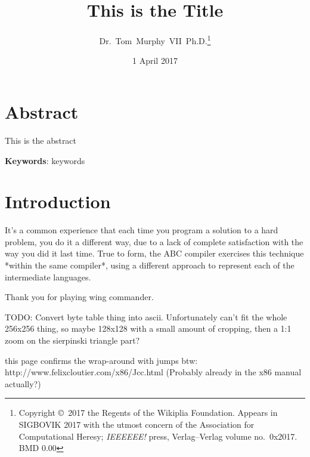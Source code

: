 \documentclass[twocolumn]{article}
\begin{document}
 

\title{This is the Title}
\author{Dr.~Tom~Murphy~VII~Ph.D.\thanks{
    Copyright \copyright\ 2017 the Regents of the Wikiplia Foundation.
    Appears in SIGBOVIK 2017 with the utmost concern of the
    Association for Computational Heresy; {\em IEEEEEE!} press,
    Verlag--Verlag volume no.~0x2017. BMD 0.00} }

\renewcommand\>{$>$}
\newcommand\<{$<$}

\date{1 April 2017}

\maketitle

\section*{Abstract}
This is the abstract

\vspace{1em}
{\noindent \small {\bf Keywords}:
  keywords
}

\section{Introduction}





It's a common experience that each time you program a solution to a
hard problem, you do it a different way, due to a lack of complete
satisfaction with the way you did it last time. True to form, the
ABC compiler exercises this technique *within the same compiler*,
using a different approach to represent each of the intermediate
languages.

Thank you for playing wing commander.

TODO: Convert byte table thing into ascii. Unfortunately can't fit
the whole 256x256 thing, so maybe 128x128 with a small amount of
cropping, then a 1:1 zoom on the sierpinski triangle part?

this page confirms the wrap-around with jumps btw:
http://www.felixcloutier.com/x86/Jcc.html
(Probably already in the x86 manual actually?)
\end{document}
